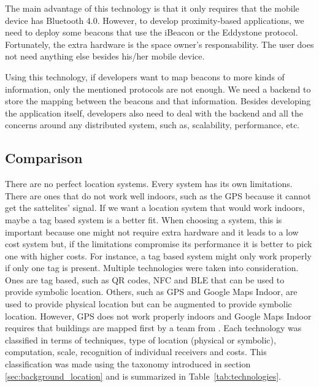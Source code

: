 The main advantage of this technology is that it only requires that the mobile device has Bluetooth 4.0.
However, to develop proximity-based applications, we need to deploy some beacons that use the iBeacon or the Eddystone protocol.
Fortunately, the extra hardware is the space owner's responsability.
The user does not need anything else besides his/her mobile device.

Using this technology, if developers want to map beacons to more kinds of information, only the mentioned protocols are not enough.
We need a backend to store the mapping between the beacons and that information.
Besides developing the application itself, developers also need to deal with the backend and all the concerns around any distributed system, such as, scalability, performance, etc.

\subsection{Comparison}
\label{sub:background_overview}
There are no perfect location systems. Every system has its own limitations.
There are ones that do not work well indoors, such as the \gls{GPS} because it cannot get the sattelites' signal.
If we want a location system that would work indoors, maybe a tag based system is a better fit.
When choosing a system, this is important because one might not require extra hardware and it leads to a low cost system but, if the limitations compromise its performance it is better to pick one with higher costs.
For instance, a tag based system might only work properly if only one tag is present.
Multiple technologies were taken into consideration.
Ones are tag based, such as \gls{QR} codes, \gls{NFC} and \gls{BLE} that can be used to provide symbolic location.
Others, such as \gls{GPS} and Google Maps Indoor, are used to provide physical location but can be augmented to provide symbolic location.
However, \gls{GPS} does not work properly indoors and Google Maps Indoor requires that buildings are mapped first by a team from .
Each technology was classified in terms of techniques, type of location (physical or symbolic), computation, scale, recognition of individual receivers and costs.
This classification was made using the taxonomy introduced in section \ref{sec:background_location} and is summarized in Table~\ref{tab:technologies}.


